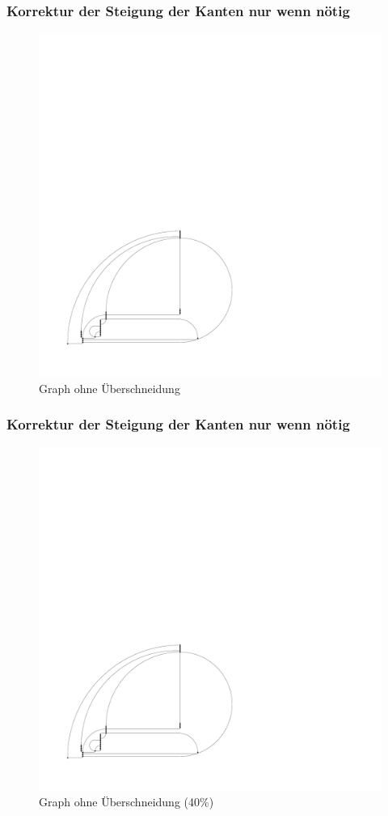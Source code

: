 \documentclass{beamer}
\begin{document}
\begin{frame}
  \frametitle{ Korrektur der Steigung der Kanten nur wenn nötig}
\begin{figure}[h]
  \centering
  \includegraphics{hugeGraph/isHuge}
  \caption{Graph ohne Überschneidung}
  \label{fig:exampleAsmoothSimple}
\end{figure}
\end{frame}

\begin{frame}
  \frametitle{ Korrektur der Steigung der Kanten nur wenn nötig}
\begin{figure}[h]
  \centering
  \includegraphics[scale=.4]{hugeGraph/isHuge}
  \caption{Graph ohne Überschneidung (40\%)}
  \label{fig:exampleAsmoothSimple}
\end{figure}
\end{frame}
\end{document}

